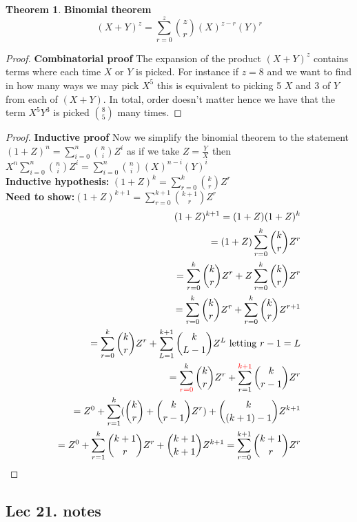 \documentclass[titlepage]{article}
\theoremstyle{definition}
\newtheorem{theorem}{Theorem}[section]
\numberwithin{equation}{subsection}
\numberwithin{remark}{subsection}
\begin{document}
\begin{theorem}\textbf{Binomial theorem}
$$(X+Y)^{z} = \sum_{r=0}^{z}\binom{z}{r}(X)^{z-r}(Y)^{r}$$
\end{theorem}

\begin{proof}\textbf{Combinatorial proof}
The expansion of the product $(X+Y)^{z}$ contains terms where each time $X$ or $Y$ is picked. For instance if $z=8$ and we want to find in how many ways we may pick $X^{5}$ this is equivalent to picking 5 $X$ and 3 of $Y$ from each of $(X+Y)$. In total, order doesn't matter hence we have that the term $X^{5}Y^{3}$ is picked $\binom{8}{5}$ many times. 
\end{proof}

\begin{proof}\textbf{Inductive proof}
Now we simplify the binomial theorem to the statement $(1+Z)^{n} = \sum_{i=0}^{n}\binom{n}{i}Z^{i}$ as if we take $Z=\frac{Y}{X}$ then $X^{n}\sum_{i=0}^{n}\binom{n}{i}Z^{i} = \sum_{i=0}^{n}\binom{n}{i}(X)^{n-i}(Y)^{i}$
\\
\textbf{Inductive hypothesis:} $(1+Z)^{k} = \sum_{r=0}^{k}\binom{k}{r}Z^{r}$
\\
\textbf{Need to show:}$(1+Z)^{k+1} = \sum_{r=0}^{k+1}\binom{k+1}{r}Z^{r}$
\\

\begin{align*}
(1+Z)^{k+1} = (1+Z)(1+Z)^{k}\\
= (1+Z)\sum_{r=0}^{k}\binom{k}{r}Z^{r}\\
= \sum_{r=0}^{k}\binom{k}{r}Z^{r} + Z\sum_{r=0}^{k}\binom{k}{r}Z^{r}\\
= \sum_{r=0}^{k}\binom{k}{r}Z^{r} + \sum_{r=0}^{k}\binom{k}{r}Z^{r+1}\\
= \sum_{r=0}^{k}\binom{k}{r}Z^{r} + \sum_{L=1}^{k+1}\binom{k}{L-1}Z^{L} \ \text{letting $r-1=L$}\\
= \sum_{\textcolor{red}{r=0}}^{k}\binom{k}{r}Z^{r} + \sum_{r=1}^{\textcolor{red}{k+1}}\binom{k}{r-1}Z^{r}\\
= Z^{0} + \sum_{r=1}^{k}(\binom{k}{r} + \binom{k}{r-1}Z^{r}) + \binom{k}{(k+1)-1}Z^{k+1}\\
= Z^{0} + \sum_{r=1}^{k}\binom{k+1}{r}Z^{r} + \binom{k+1}{k+1}Z^{k+1} = \sum_{r=0}^{k+1}\binom{k+1}{r}Z^{r}\\
\end{align*}

\end{proof}


\subsection{Lec 21. notes}
\end{document}
